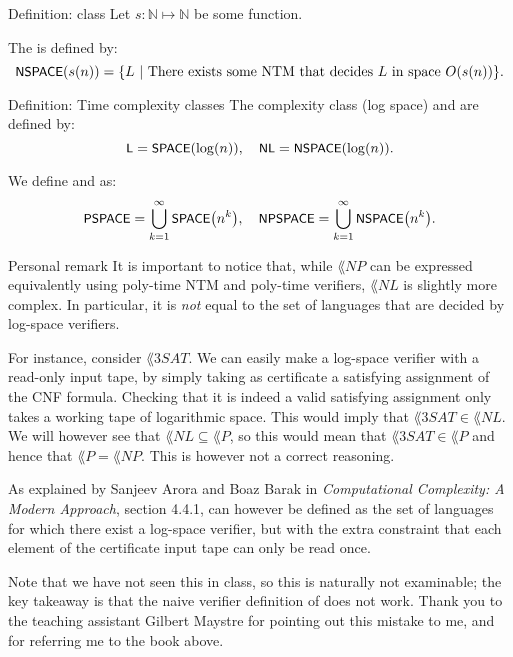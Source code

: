 \documentclass[a4paper]{article}
\begin{document}
\begin{parag}{Definition:  class}
    Let $s: \mathbb{N} \mapsto \mathbb{N}$ be some function.

    The  is defined by:
    \[\lang{NSPACE}\left(s\left(n\right)\right) = \left\{L \suchthat \text{There exists some NTM that decides $L$ in space $O\left(s\left(n\right)\right)$}\right\}.\]
\end{parag}

\begin{parag}{Definition: Time complexity classes}
    The complexity class  (log space) and  are defined by: 
    \[\lang{L} = \lang{SPACE}\left(\log\left(n\right)\right), \mathspace \lang{NL} = \text{\lang{NSPACE}}\left(\log\left(n\right)\right).\]

    We define  and  as:
    \[\lang{PSPACE} = \bigcup_{k=1}^{\infty} \lang{SPACE}\left(n^k\right), \mathspace \lang{NPSPACE} = \bigcup_{k=1}^{\infty} \lang{NSPACE}\left(n^k\right).\]

    \begin{subparag}{Personal remark}
        It is important to notice that, while $\lang{NP}$ can be expressed equivalently using poly-time NTM and poly-time verifiers, $\lang{NL}$ is slightly more complex. In particular, it is \emph{not} equal to the set of languages that are decided by log-space verifiers. 

        For instance, consider $\lang{3SAT}$. We can easily make a log-space verifier with a read-only input tape, by simply taking as certificate a satisfying assignment of the CNF formula. Checking that it is indeed a valid satisfying assignment only takes a working tape of logarithmic space. This would imply that $\lang{3SAT} \in \lang{NL}$. We will however see that $\lang{NL} \subseteq \lang{P}$, so this would mean that $\lang{3SAT}\in \lang{P}$ and hence that $\lang{P} = \lang{NP}$. This is however not a correct reasoning.

        As explained by Sanjeev Arora and Boaz Barak in \textit{Computational Complexity: A Modern Approach}, section 4.4.1,  can however be defined as the set of languages for which there exist a log-space verifier, but with the extra constraint that each element of the certificate input tape can only be read once.

        Note that we have not seen this in class, so this is naturally not examinable; the key takeaway is that the naive verifier definition of  does not work. Thank you to the teaching assistant Gilbert Maystre for pointing out this mistake to me, and for referring me to the book above.
    \end{subparag}
\end{parag}
\end{document}

